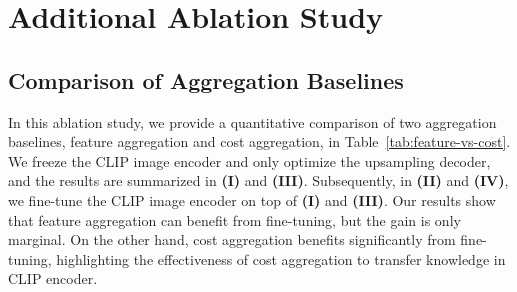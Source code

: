 \documentclass[10pt,twocolumn,letterpaper]{article}
\begin{document}
\section{Additional Ablation Study}\label{B}
\subsection{Comparison of Aggregation Baselines}\vspace{-10pt}
\begin{table}[H]
    \centering
    \vspace{-5pt}
    \caption{\textbf{Quantitative comparison between feature and cost aggregation.} Cost aggregation acts as an effective alternative to direct fine-tuning of CLIP image encoder. \textit{F.T.: Fine-Tuning.}
    }
    \label{tab:feature-vs-cost}
    \vspace{-10pt}

\end{table}
 In this ablation study, we provide a quantitative comparison of two aggregation baselines, feature aggregation and cost aggregation, in Table~\ref{tab:feature-vs-cost}. We freeze the CLIP image encoder and only optimize the upsampling decoder, and the results are summarized in \textbf{(I)} and \textbf{(III)}. Subsequently, in \textbf{(II)} and \textbf{(IV)}, we fine-tune the CLIP image encoder on top of \textbf{(I)} and \textbf{(III)}. Our results show that feature aggregation  can benefit from fine-tuning, but the gain is only marginal. On the other hand, cost aggregation benefits significantly from fine-tuning, highlighting the effectiveness of cost aggregation to transfer knowledge in CLIP encoder. 
\end{document}

